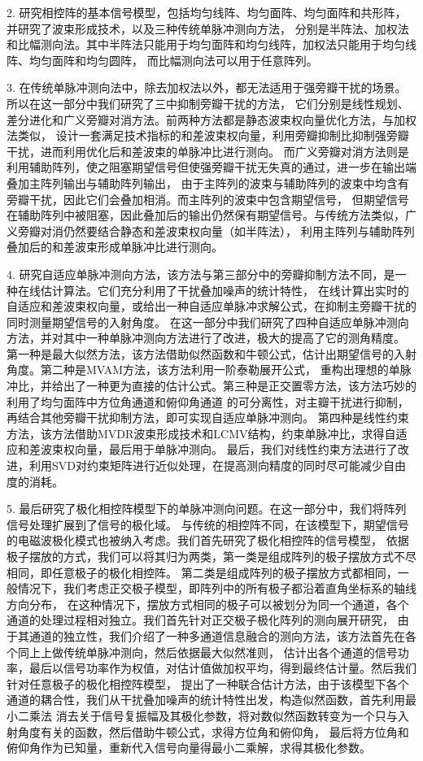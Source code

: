 \documentclass[master]{thesis-uestc}
\begin{document}
2. 研究相控阵的基本信号模型，包括均匀线阵、均匀面阵、均匀面阵和共形阵，并研究了波束形成技术，以及三种传统单脉冲测向方法，
分别是半阵法、加权法和比幅测向法。其中半阵法只能用于均匀面阵和均匀线阵，加权法只能用于均匀线阵、均匀面阵和均匀圆阵，
而比幅测向法可以用于任意阵列。

3. 在传统单脉冲测向法中，除去加权法以外，都无法适用于强旁瓣干扰的场景。所以在这一部分中我们研究了三中抑制旁瓣干扰的方法，
它们分别是线性规划、差分进化和广义旁瓣对消方法。前两种方法都是静态波束权向量优化方法，与加权法类似，
设计一套满足技术指标的和差波束权向量，利用旁瓣抑制比抑制强旁瓣干扰，进而利用优化后和差波束的单脉冲比进行测向。
而广义旁瓣对消方法则是利用辅助阵列，使之阻塞期望信号但使强旁瓣干扰无失真的通过，进一步在输出端叠加主阵列输出与辅助阵列输出，
由于主阵列的波束与辅助阵列的波束中均含有旁瓣干扰，因此它们会叠加相消。而主阵列的波束中包含期望信号，
但期望信号在辅助阵列中被阻塞，因此叠加后的输出仍然保有期望信号。与传统方法类似，广义旁瓣对消仍然要结合静态和差波束权向量（如半阵法），
利用主阵列与辅助阵列叠加后的和差波束形成单脉冲比进行测向。

4. 研究自适应单脉冲测向方法，该方法与第三部分中的旁瓣抑制方法不同，是一种在线估计算法。它们充分利用了干扰叠加噪声的统计特性，
在线计算出实时的自适应和差波束权向量，或给出一种自适应单脉冲求解公式，在抑制主旁瓣干扰的同时测量期望信号的入射角度。
在这一部分中我们研究了四种自适应单脉冲测向方法，并对其中一种单脉冲测向方法进行了改进，极大的提高了它的测角精度。
第一种是最大似然方法，该方法借助似然函数和牛顿公式，估计出期望信号的入射角度。第二种是MVAM方法，该方法利用一阶泰勒展开公式，
重构出理想的单脉冲比，并给出了一种更为直接的估计公式。第三种是正交置零方法，该方法巧妙的利用了均匀面阵中方位角通道和俯仰角通道
的可分离性，对主瓣干扰进行抑制，再结合其他旁瓣干扰抑制方法，即可实现自适应单脉冲测向。
第四种是线性约束方法，该方法借助MVDR波束形成技术和LCMV结构，约束单脉冲比，求得自适应和差波束权向量，最后用于单脉冲测向。
最后，我们对线性约束方法进行了改进，利用SVD对约束矩阵进行近似处理，在提高测向精度的同时尽可能减少自由度的消耗。

5. 最后研究了极化相控阵模型下的单脉冲测向问题。在这一部分中，我们将阵列信号处理扩展到了信号的极化域。
与传统的相控阵不同，在该模型下，期望信号的电磁波极化模式也被纳入考虑。我们首先研究了极化相控阵的信号模型，
依据极子摆放的方式，我们可以将其归为两类，第一类是组成阵列的极子摆放方式不尽相同，即任意极子的极化相控阵。
第二类是组成阵列的极子摆放方式都相同，一般情况下，我们考虑正交极子模型，即阵列中的所有极子都沿着直角坐标系的轴线方向分布，
在这种情况下，摆放方式相同的极子可以被划分为同一个通道，各个通道的处理过程相对独立。我们首先针对正交极子极化阵列的测向展开研究，
由于其通道的独立性，我们介绍了一种多通道信息融合的测向方法，该方法首先在各个同上上做传统单脉冲测向，然后依据最大似然准则，
估计出各个通道的信号功率，最后以信号功率作为权值，对估计值做加权平均，得到最终估计量。然后我们针对任意极子的极化相控阵模型，
提出了一种联合估计方法，由于该模型下各个通道的耦合性，我们从干扰叠加噪声的统计特性出发，构造似然函数，首先利用最小二乘法
消去关于信号复振幅及其极化参数，将对数似然函数转变为一个只与入射角度有关的函数，然后借助牛顿公式，求得方位角和俯仰角，
最后将方位角和俯仰角作为已知量，重新代入信号向量得最小二乘解，求得其极化参数。
\end{document}
